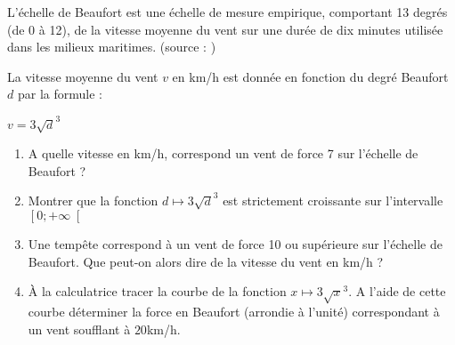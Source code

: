 
%
L'échelle de Beaufort est une échelle de mesure empirique, comportant 13 degrés (de 0 à 12), de la vitesse moyenne du vent sur une durée de dix minutes utilisée dans les milieux maritimes. (source : )
\par
La vitesse moyenne du vent $v$ en km/h est donnée en fonction du degré Beaufort $d$ par la formule :
\par
$v = 3 \sqrt{d} ^{3}$
\begin{enumerate}
     \item
     A quelle vitesse en km/h, correspond un vent de force 7 sur l'échelle de Beaufort ?
     \item
     Montrer que la fonction $d \mapsto  3 \sqrt{d} ^{3}$ est strictement croissante sur l'intervalle $\left[0; +\infty \right[$
     \item
     Une tempête correspond à un vent de force 10 ou supérieure sur l'échelle de Beaufort. Que peut-on alors dire de la vitesse du vent en km/h ?
     \item
     À la calculatrice tracer la courbe de la fonction $x \mapsto  3 \sqrt{x} ^{3}$. A l'aide de cette courbe déterminer la force en Beaufort (arrondie à l'unité) correspondant à un vent soufflant à $20$km/h.
\end{enumerate}

